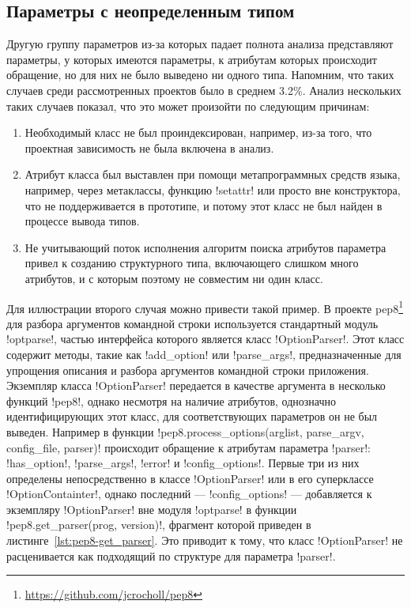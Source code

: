 \subsection{Параметры с неопределенным типом}
\label{sub:undefined-type-parameters}

Другую группу параметров из-за которых падает полнота анализа представляют
параметры, у которых имеются параметры, к атрибутам которых происходит
обращение, но для них не было выведено ни одного типа. Напомним, что таких
случаев среди рассмотренных проектов было в среднем 3.2\%. Анализ нескольких
таких случаев показал, что это может произойти по следующим причинам:

\begin{enumerate}
    \item Необходимый класс не был проиндексирован, например, из-за того, что
      проектная зависимость не была включена в анализ.

    \item Атрибут класса был выставлен при помощи метапрограммных средств языка,
      например, через метаклассы, функцию !setattr! или просто
      вне конструктора, что не поддерживается в прототипе, и потому этот класс не был
      найден в процессе вывода типов.

    \item Не учитывающий поток исполнения алгоритм поиска атрибутов параметра
      привел к созданию структурного типа, включающего слишком много
      атрибутов, и с которым поэтому не совместим ни один класс.

\end{enumerate}

Для иллюстрации второго случая можно привести такой пример. В проекте
pep8\footnote{\url{https://github.com/jcrocholl/pep8}} для разбора аргументов
командной строки используется стандартный модуль !optparse!, частью интерфейса
которого является класс !OptionParser!. Этот класс содержит методы, такие как
!add_option! или !parse_args!, 
предназначенные для упрощения описания и разбора аргументов командной строки
приложения. Экземпляр класса !OptionParser! передается в качестве аргумента в
несколько функций !pep8!, однако несмотря на наличие атрибутов, однозначно
идентифицирующих этот класс, для соответствующих параметров он не был выведен.
Например в функции !pep8.process_options(arglist, parse_argv, config_file, parser)!
происходит обращение к атрибутам параметра
!parser!: !has_option!, !parse_args!, !error! и !config_options!. Первые три из
них определены непосредственно в классе !OptionParser! или в его суперклассе
!OptionContainter!, однако последний --- !config_options! --- добавляется к
экземпляру !OptionParser! вне модуля !optparse! в функции
!pep8.get_parser(prog, version)!, фрагмент которой приведен в
листинге~\ref{lst:pep8-get_parser}. Это приводит к тому, что класс
!OptionParser! не расценивается как подходящий по структуре для параметра
!parser!.

